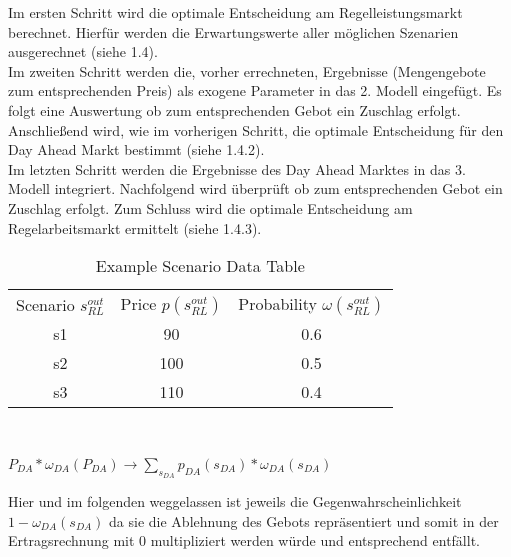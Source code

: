 Im ersten Schritt wird die optimale Entscheidung am Regelleistungsmarkt berechnet. Hierfür werden die Erwartungswerte aller möglichen Szenarien ausgerechnet (siehe 1.4).\\

Im zweiten Schritt werden die, vorher errechneten, Ergebnisse (Mengengebote zum entsprechenden Preis) als exogene Parameter in das 2. Modell eingefügt. Es folgt eine Auswertung ob zum entsprechenden Gebot ein Zuschlag erfolgt. Anschließend wird, wie im vorherigen Schritt, die optimale Entscheidung für den Day Ahead Markt bestimmt (siehe 1.4.2).\\

Im letzten Schritt werden die Ergebnisse des Day Ahead Marktes in das 3. Modell integriert. Nachfolgend wird überprüft ob zum entsprechenden Gebot ein Zuschlag erfolgt. Zum Schluss wird die optimale Entscheidung am Regelarbeitsmarkt ermittelt (siehe 1.4.3).\\








\begin{table}
	\begin{tabular}{c|c|c}
		Scenario $s^{out}_{RL}$ & Price $p(s^{out}_{RL})$ & Probability $\omega(s^{out}_{RL})$ \\
		s1                      & 90                      & 0.6                                \\
		s2                      & 100                     & 0.5                                \\
		s3                      & 110                     & 0.4                                \\
	\end{tabular}\\
	\label{tab:example_scenario}
	\caption{Example Scenario Data Table}
\end{table}

$P_{DA} * \omega_{DA}(P_{DA}) \rightarrow \sum_{s_{DA}} p_{DA}(s_{DA}) * \omega_{DA}(s_{DA})$\\


Hier und im folgenden weggelassen ist jeweils die Gegenwahrscheinlichkeit $1-\omega_{DA}(s_{DA})$ da sie die Ablehnung des Gebots repräsentiert und somit in der Ertragsrechnung mit 0 multipliziert werden würde und entsprechend entfällt.\\
\\




